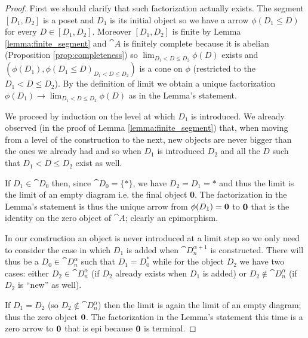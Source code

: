 \begin{proof}
  First we should clarify that such factorization actually exists. The segment \([D_1, D_2]\) is a poset and \(D_1\) is its initial object so we have a arrow \(\phi(D_1\leq D)\) for every \(D\in[D_1, D_2]\). Moreover \([D_1, D_2]\) is finite by Lemma \ref{lemma:finite_segment} and \(\cat{A}\) is finitely complete because it is abelian (Proposition \ref{prop:completeness}) so \(\lim_{D_1<D\leq D_2}\phi(D)\) exists and \((\phi(D_1), \phi(D_1\leq D)_{D_1<D\leq D_2})\) is a cone on \(\phi\) (restricted to the \(D_1<D\leq D_2\)). By the definition of limit we obtain a unique factorization \(\phi(D_1)\to\lim_{D_1<D\leq D_2}\phi(D)\) as in the Lemma's statement.

  We proceed by induction on the level at which \(D_1\) is introduced. We already observed (in the proof of Lemma \ref{lemma:finite_segment}) that, when moving from a level of the construction to the next, new objects are never bigger than the ones we already had and so when \(D_1\) is introduced \(D_2\) and all the \(D\) such that \(D_1<D\leq D_2\) exist as well.

  If \(D_1\in\cat{D}_0\) then, since \(\cat{D}_0 = \{*\}\), we have \(D_2 = D_1 = *\) and thus the limit is the limit of an empty diagram i.e. the final object {\bf 0}. The factorization in the Lemma's statement is thus the unique arrow from \(\phi(D_1) = {\bf 0}\) to \({\bf 0}\) that is the identity on the zero object of \(\cat{A}\); clearly an epimorphism.

  In our construction an object is never introduced at a limit step so we only need to consider the case in which \(D_1\) is added when \(\cat{D}_n^{\alpha + 1}\) is constructed. There will thus be a \(D_0\in\cat{D}_n^\alpha\) such that \(D_1 = D_0^*\) while for the object \(D_2\) we have two cases: either \(D_2\in\cat{D}_n^\alpha\) (if \(D_2\) already exists when \(D_1\) is added) or \(D_2\not\in\cat{D}_n^\alpha\) (if \(D_2\) is ``new'' as well).

  If \(D_1 = D_2\) (so \(D_2\not\in\cat{D}_n^\alpha\)) then the limit is again the limit of an empty diagram; thus the zero object \({\bf 0}\). The factorization in the Lemma's statement this time is a zero arrow to \({\bf 0}\) that is epi because \({\bf 0}\) is terminal.


\end{proof}
